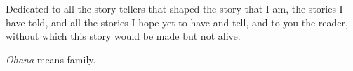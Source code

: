 \thispagestyle{empty}
{}

\vspace*{3cm}

\begin{center}
    Dedicated to all the story-tellers that shaped the story that I am, the stories I have told,
    and all the stories I hope yet to have and tell, and to you the reader, without which this
    story would be made but not alive.
\end{center}

\medskip

\begin{center}
    \emph{Ohana} means family. \\
\end{center}

